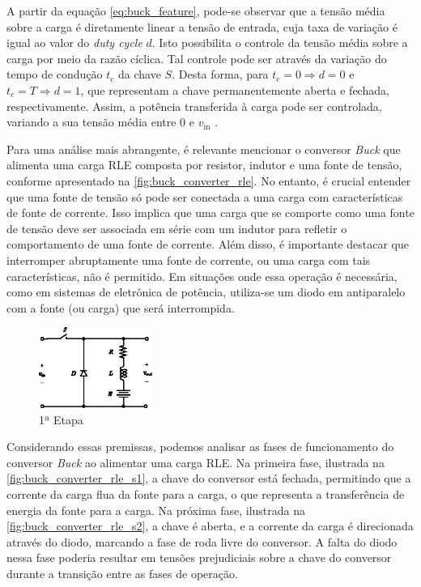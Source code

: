 A partir da equação \eqref{eq:buck_feature}, pode-se observar que a tensão média sobre a carga é diretamente linear a tensão de entrada, cuja taxa de variação é igual ao valor do \textit{duty cycle }$d$. Isto possibilita o controle da tensão média sobre a carga por meio da razão cíclica. Tal controle pode ser através da variação do tempo de condução $t_c$ da chave $S$. Desta forma, para $t_c = 0 \Rightarrow d = 0$ e $t_c = T \Rightarrow d = 1$, que representam a chave permanentemente aberta e fechada, respectivamente. Assim, a potência transferida à carga pode ser controlada, variando a sua tensão média entre 0 e $v_{\mathrm{in}}$ \citep{martins2008}.

Para uma análise mais abrangente, é relevante mencionar o conversor \textit{Buck} que alimenta uma carga RLE composta por resistor, indutor e uma fonte de tensão, conforme apresentado na \autoref{fig:buck_converter_rle}. No entanto, é crucial entender que uma fonte de tensão só pode ser conectada a uma carga com características de fonte de corrente. Isso implica que uma carga que se comporte como uma fonte de tensão deve ser associada em série com um indutor para refletir o comportamento de uma fonte de corrente. Além disso, é importante destacar que interromper abruptamente uma fonte de corrente, ou uma carga com tais características, não é permitido. Em situações onde essa operação é necessária, como em sistemas de eletrônica de potência, utiliza-se um diodo em antiparalelo com a fonte (ou carga) que será interrompida. 

\begin{figure}[H]
  \centering
  \includegraphics[width=0.33\textwidth]{figuras/buck_converter_rle.eps}
  \caption{1ª Etapa}
  \label{fig:buck_converter_rle}
\end{figure}

Considerando essas premissas, podemos analisar as fases de funcionamento do conversor \textit{Buck} ao alimentar uma carga RLE. Na primeira fase, ilustrada na \autoref{fig:buck_converter_rle_s1}, a chave do conversor está fechada, permitindo que a corrente da carga flua da fonte para a carga, o que representa a transferência de energia da fonte para a carga. Na próxima fase, ilustrada na \autoref{fig:buck_converter_rle_s2}, a chave é aberta, e a corrente da carga é direcionada através do diodo, marcando a fase de roda livre do conversor. A falta do diodo nessa fase poderia resultar em tensões prejudiciais sobre a chave do conversor durante a transição entre as fases de operação. 

